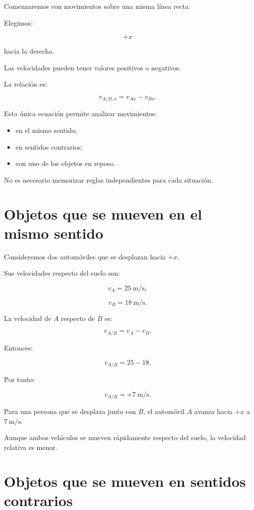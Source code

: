Comenzaremos con movimientos sobre una misma línea recta.

Elegimos:

\[
+x
\]

hacia la derecha.

Las velocidades pueden tener valores positivos o negativos.

La relación es:

\[
\boxed{
v_{A/B,x}=v_{Ax}-v_{Bx}
}.
\]

Esta única ecuación permite analizar movimientos:

\begin{itemize}
    \item en el mismo sentido;
    \item en sentidos contrarios;
    \item con uno de los objetos en reposo.
\end{itemize}

No es necesario memorizar reglas independientes para cada situación.


\section{Objetos que se mueven en el mismo sentido}

Consideremos dos automóviles que se desplazan hacia \(+x\).

Sus velocidades respecto del suelo son:

\[
v_A=\SI{25}{\meter\per\second},
\]

\[
v_B=\SI{18}{\meter\per\second}.
\]

La velocidad de \(A\) respecto de \(B\) es:

\[
v_{A/B}=v_A-v_B.
\]

Entonces:

\[
v_{A/B}=25-18.
\]

Por tanto:

\[
\boxed{
v_{A/B}=+\SI{7}{\meter\per\second}
}.
\]

\begin{interpretacion}

Para una persona que se desplaza junto con \(B\), el
automóvil \(A\) avanza hacia \(+x\) a
\(\SI{7}{\meter\per\second}\).

Aunque ambos vehículos se mueven rápidamente respecto
del suelo, la velocidad relativa es menor.

\end{interpretacion}


\section{Objetos que se mueven en sentidos contrarios}

